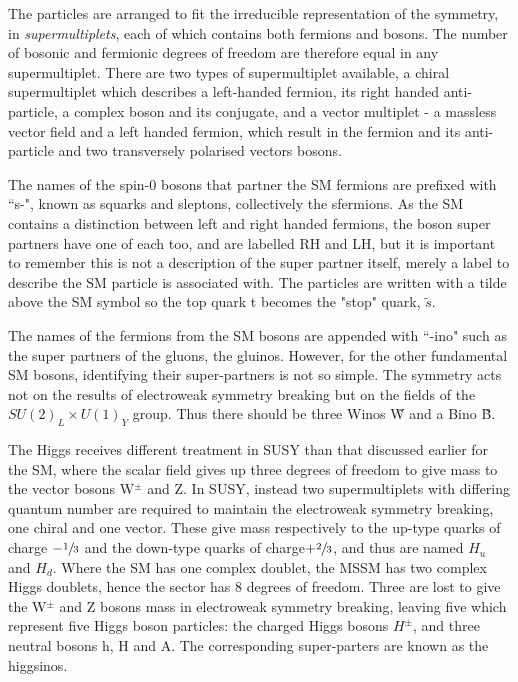 The particles are arranged to fit the irreducible representation of the symmetry, in \textit{supermultiplets}, each of which contains both fermions and bosons. The number of bosonic and fermionic degrees of freedom are therefore equal in any supermultiplet. There are two types of supermultiplet available, a chiral supermultiplet which describes a left-handed fermion, its right handed anti-particle, a complex boson and its conjugate, and a vector multiplet - a massless vector field and a left handed fermion, which result in the fermion and its anti-particle and two transversely polarised vectors bosons\cite{SUSYPrime}. 

The names of the spin-0 bosons that partner the SM fermions are prefixed with ``s-", known as squarks and sleptons, collectively the sfermions. As the SM contains a distinction between left and right handed fermions, the boson super partners have one of each too, and are labelled RH and LH, but it is important to remember this is not a description of the super partner itself, merely a label to describe the SM particle is associated with. The particles are written with a tilde above the SM symbol so the top quark t becomes the "stop" quark, $\tilde{s}$.

The names of the fermions from the SM bosons are appended with ``-ino" such as the super partners of the gluons, the gluinos. However, for the other fundamental SM bosons, identifying their super-partners is not so simple. The symmetry acts not on the results of electroweak symmetry breaking but on the fields of the $SU(2)_{L} \times U(1)_{Y}$ group. Thus there should be three Winos \~{W} and a Bino \~{B}. 

The Higgs receives different treatment in SUSY than that discussed earlier for the SM, where the scalar field gives up three degrees of freedom to give mass to the vector bosons W$^{\pm}$ and Z. In SUSY, instead two supermultiplets with differing quantum number are required to maintain the electroweak symmetry breaking, one chiral and one vector. These give mass respectively to the up-type quarks of charge $-\sfrac{1}{3}$ and the down-type quarks of charge$+\sfrac{2}{3}$, and thus are named $H_{u}$ and $H_{d}$\cite{SUSYsuch}. Where the SM has one complex doublet, the MSSM has two complex Higgs doublets, hence the sector has 8 degrees of freedom. Three are lost to give the W$^{\pm}$ and Z bosons mass in electroweak symmetry breaking, leaving five which represent five Higgs boson particles: the charged Higgs bosons $H^{\pm}$, and three neutral bosons h, H and A. The corresponding super-parters are known as the higgsinos.  


